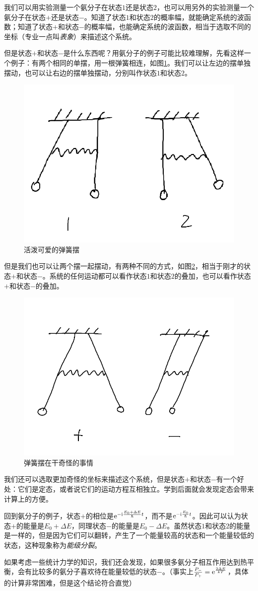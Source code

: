 我们可以用实验测量一个氨分子在状态$1$还是状态$2$，也可以用另外的实验测量一个氨分子在状态$+$还是状态$-$。知道了状态$1$和状态$2$的概率幅，就能确定系统的波函数；知道了状态$+$和状态$-$的概率幅，也能确定系统的波函数，相当于选取不同的坐标（专业一点叫\emph{表象}）来描述这个系统。

但是状态$+$和状态$-$是什么东西呢？用氨分子的例子可能比较难理解，先看这样一个例子：有两个相同的单摆，用一根弹簧相连，如图\ref{fig-spring-pend}。我们可以让左边的摆单独摆动，也可以让右边的摆单独摆动，分别叫作状态$1$和状态$2$。
\begin{figure}[htb]
\centering
\includegraphics[width=0.33\linewidth]{fig/spring-pend.png}
\caption{活泼可爱的弹簧摆}
\label{fig-spring-pend}
\end{figure}

但是我们也可以让两个摆一起摆动，有两种不同的方式，如图\ref{fig-spring-pend-2}，相当于刚才的状态$+$和状态$-$。系统的任何运动都可以看作状态$1$和状态$2$的叠加，也可以看作状态$+$和状态$-$的叠加。
\begin{figure}[htb]
\centering
\includegraphics[width=0.33\linewidth]{fig/spring-pend-2.png}
\caption{弹簧摆在干奇怪的事情}
\label{fig-spring-pend-2}
\end{figure}

我们还可以选取更加奇怪的坐标来描述这个系统，但是状态$+$和状态$-$有一个好处：它们是定态，或者说它们的运动方程互相独立。学到后面就会发现定态会带来计算上的方便。

回到氨分子的例子，状态$+$的相位是$\mathrm{e}^{-\mathrm{i} \frac{E_0+\Delta E}{\hbar} t}$，而不是$\mathrm{e}^{-\mathrm{i} \frac{E_0}{\hbar} t}$。因此可以认为状态$+$的能量是$E_0+\Delta E$，同理状态$-$的能量是$E_0-\Delta E$。虽然状态$1$和状态$2$的能量是一样的，但是因为它们可以翻转，产生了一个能量较高的状态和一个能量较低的状态，这种现象称为\emph{能级分裂}。

如果考虑一些统计力学的知识，我们还会发现，如果很多氨分子相互作用达到热平衡，会有比较多的氨分子喜欢待在能量较低的状态$-$。（事实上$\frac{P_-}{P_+}=\mathrm{e}^{\frac{2 \Delta E}{k T}}$，具体的计算非常困难，但是这个结论符合直觉）

